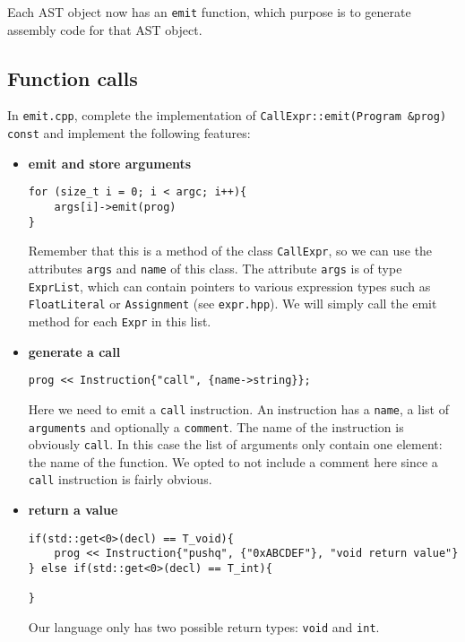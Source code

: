 \documentclass{report}
\begin{document}
	
	Each AST object now has an \texttt{emit} function, which purpose is to generate assembly code for that AST object.
	\subsection{Function calls}
	In \texttt{emit.cpp}, complete the implementation of \texttt{CallExpr::emit(Program \&prog) const} and implement the following features:
	
	\begin{itemize}
		\item \textbf{emit and store arguments}
		\begin{lstlisting}
for (size_t i = 0; i < argc; i++){
	args[i]->emit(prog)
}
		\end{lstlisting}
		Remember that this is a method of the class \texttt{CallExpr}, so we can use the attributes \texttt{args} and \texttt{name} of this class. The attribute \texttt{args} is of type \texttt{ExprList}, which can contain pointers to various expression types such as \texttt{FloatLiteral} or \texttt{Assignment} (see \texttt{expr.hpp}). We will simply call the emit method for each \texttt{Expr} in this list.
		
		\item \textbf{generate a call}
		\begin{lstlisting}
prog << Instruction{"call", {name->string}};
		\end{lstlisting}
		Here we need to emit a \texttt{call} instruction. An instruction has a \texttt{name}, a list of \texttt{arguments} and optionally a \texttt{comment}. The name of the instruction is obviously \texttt{call}. In this case the list of arguments only contain one element: the name of the function. We opted to not include a comment here since a \texttt{call} instruction is fairly obvious.
		
		\item \textbf{return a value}
		\begin{lstlisting}
if(std::get<0>(decl) == T_void){
	prog << Instruction{"pushq", {"0xABCDEF"}, "void return value"}
} else if(std::get<0>(decl) == T_int){

}
		\end{lstlisting}
		Our language only has two possible return types: \texttt{void} and \texttt{int}. 
	\end{itemize}
\end{document}
